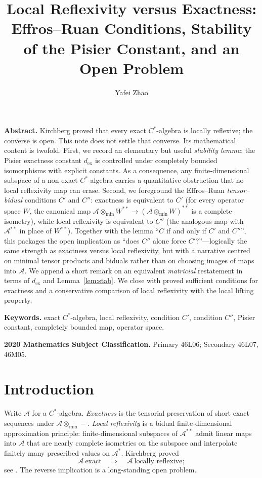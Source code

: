 \documentclass[12pt]{article}
\title{Local Reflexivity versus Exactness: Effros--Ruan Conditions, Stability of the Pisier Constant, and an Open Problem}
\author{Yafei Zhao}
\date{}
\newcommand{\A}{\mathcal A}
\newcommand{\otmin}{\otimes_{\min}}
\newcommand{\dex}{d_{\mathrm{ex}}}
\begin{document}
\maketitle

\begin{center}
\begin{minipage}{11.5cm}
{\bf Abstract.}
Kirchberg proved that every exact $C^*$-algebra is locally reflexive; the converse is open.  This note does not settle that converse.  Its mathematical content is twofold.  First, we record an elementary but useful \emph{stability lemma}: the Pisier exactness constant $\dex$ is controlled under completely bounded isomorphisms with explicit constants.  As a consequence, any finite-dimensional subspace of a non-exact $C^*$-algebra carries a quantitative obstruction that no local reflexivity map can erase.  Second, we foreground the Effros--Ruan \emph{tensor--bidual} conditions $C'$ and $C''$: exactness is equivalent to $C'$ (for every operator space $W$, the canonical map $\A\otmin W^{**}\to(\A\otmin W)^{**}$ is a complete isometry), while local reflexivity is equivalent to $C''$ (the analogous map with $\A^{**}$ in place of $W^{**}$).  Together with the lemma ``$C$ if and only if $C'$ and $C''$'', this packages the open implication as ``does $C''$ alone force $C'$?''---logically the same strength as exactness versus local reflexivity, but with a narrative centred on minimal tensor products and biduals rather than on choosing images of maps into $\A$.  We append a short remark on an equivalent \emph{matricial} restatement in terms of $\dex$ and Lemma~\ref{lem:stab}.  We close with proved sufficient conditions for exactness and a conservative comparison of local reflexivity with the local lifting property.

\medskip
{\bf Keywords.} exact $C^*$-algebra, local reflexivity, condition $C'$, condition $C''$, Pisier constant, completely bounded map, operator space.

\medskip
{\bf 2020 Mathematics Subject Classification.} Primary 46L06; Secondary 46L07, 46M05.
\end{minipage}
\end{center}

\section{Introduction}

Write $\A$ for a $C^*$-algebra.  \emph{Exactness} is the tensorial preservation of short exact sequences under $\A\otmin -$.  \emph{Local reflexivity} is a bidual finite-dimensional approximation principle: finite-dimensional subspaces of $\A^{**}$ admit linear maps into $\A$ that are nearly complete isometries on the subspace and interpolate finitely many prescribed values on $\A^*$.  Kirchberg proved
\[
        \A\ \text{exact}\quad\Longrightarrow\quad \A\ \text{locally reflexive};
\]
see \cite[Ch.~9]{BO}.  The reverse implication is a long-standing open problem.
\end{document}
